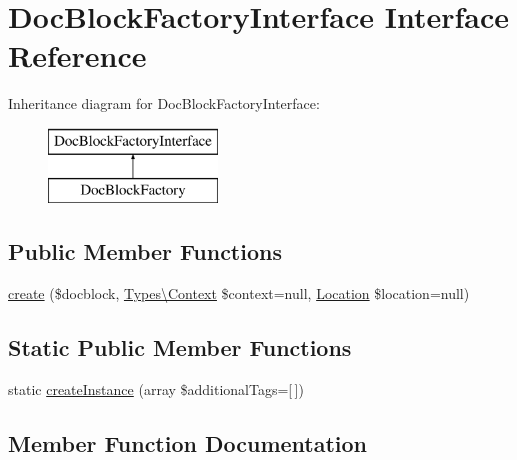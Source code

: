\hypertarget{interfacephp_documentor_1_1_reflection_1_1_doc_block_factory_interface}{}\section{Doc\+Block\+Factory\+Interface Interface Reference}
\label{interfacephp_documentor_1_1_reflection_1_1_doc_block_factory_interface}
Inheritance diagram for Doc\+Block\+Factory\+Interface\+:\begin{figure}[H]
\begin{center}
\leavevmode
\includegraphics[height=2.000000cm]{interfacephp_documentor_1_1_reflection_1_1_doc_block_factory_interface}
\end{center}
\end{figure}
\subsection*{Public Member Functions}
\begin{DoxyCompactItemize}
\item 
\mbox{\hyperlink{interfacephp_documentor_1_1_reflection_1_1_doc_block_factory_interface_a251d38c040d9a6165cecd6af41076d56}{create}} (\$docblock, \mbox{\hyperlink{classphp_documentor_1_1_reflection_1_1_types_1_1_context}{Types\textbackslash{}\+Context}} \$context=null, \mbox{\hyperlink{classphp_documentor_1_1_reflection_1_1_location}{Location}} \$location=null)
\end{DoxyCompactItemize}
\subsection*{Static Public Member Functions}
\begin{DoxyCompactItemize}
\item 
static \mbox{\hyperlink{interfacephp_documentor_1_1_reflection_1_1_doc_block_factory_interface_a220aa312016b6fa0c9a6c4bf61a7ead4}{create\+Instance}} (array \$additional\+Tags=\mbox{[}$\,$\mbox{]})
\end{DoxyCompactItemize}


\subsection{Member Function Documentation}
\mbox{\label{interfacephp_documentor_1_1_reflection_1_1_doc_block_factory_interface_a251d38c040d9a6165cecd6af41076d56}} 
